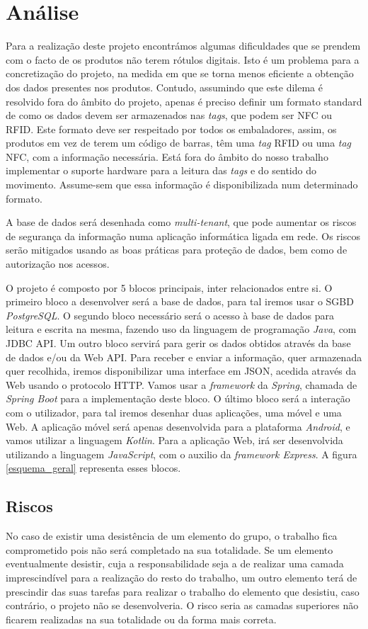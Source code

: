 %
%
\section*{Análise} \label{Analise}

Para a realização deste projeto encontrámos algumas dificuldades que se prendem com o facto de os produtos não terem rótulos digitais. Isto é um problema para a concretização do projeto, na medida em que se torna menos eficiente a obtenção dos dados presentes nos produtos. Contudo, assumindo que este dilema é resolvido fora do âmbito do projeto, apenas é preciso definir um formato standard de como os dados devem ser armazenados nas \textit{tags}, que podem ser NFC ou RFID. Este formato deve ser respeitado por todos os embaladores, assim, os produtos em vez de terem um código de barras, têm uma \textit{tag} RFID ou uma \textit{tag} NFC, com a informação necessária. Está fora do âmbito do nosso trabalho implementar o suporte hardware para a leitura das \textit{tags} e do sentido do movimento. Assume-sem que essa informação é disponibilizada num determinado formato. 

A base de dados será desenhada como \textit{multi-tenant}, que pode aumentar os riscos de segurança da informação numa aplicação informática ligada em rede. Os riscos serão mitigados usando as boas práticas para proteção de dados, bem como de autorização nos acessos.

O projeto é composto por 5 blocos principais, inter relacionados entre si. O primeiro bloco a desenvolver será a base de dados, para tal iremos usar o SGBD \textit{PostgreSQL}. O segundo bloco necessário será o acesso à base de dados para leitura e escrita na mesma, fazendo uso da linguagem de programação \textit{Java}, com JDBC API. Um outro bloco servirá para gerir os dados obtidos através da base de dados e/ou da Web API. Para receber e enviar a informação, quer armazenada quer recolhida, iremos disponibilizar uma interface em JSON, acedida através da Web usando o protocolo HTTP. Vamos usar a \textit{framework} da \textit{Spring}, chamada de \textit{Spring Boot} para a implementação deste bloco. O último bloco será a interação com o utilizador, para tal iremos desenhar duas aplicações, uma móvel e uma Web. A aplicação móvel será apenas desenvolvida para a plataforma \textit{Android}, e vamos utilizar a linguagem \textit{Kotlin}. Para a aplicação Web, irá ser desenvolvida utilizando a linguagem \textit{JavaScript}, com o auxilio da \textit{framework Express}. A figura \ref{esquema_geral} representa esses blocos.


\subsection*{Riscos}
No caso de existir uma desistência de um elemento do grupo, o trabalho fica comprometido pois não será completado na sua totalidade. Se um elemento eventualmente desistir, cuja a responsabilidade seja a de realizar uma camada imprescindível para a realização do resto do trabalho, um outro elemento terá de prescindir das suas tarefas para realizar o trabalho do elemento que desistiu, caso contrário, o projeto não se desenvolveria. O risco seria as camadas superiores não ficarem realizadas na sua totalidade ou da forma mais correta.